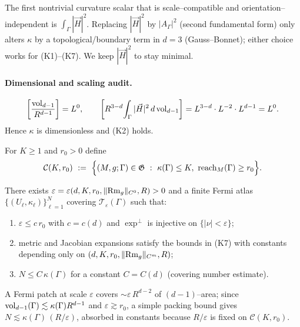 \begin{remark}[Minimality]
The first nontrivial curvature scalar that is scale–compatible and orientation–independent is $\int_\Gamma |\vec H|^2$. Replacing $|\vec H|^2$ by $|A_\Gamma|^2$ (second fundamental form) only alters $\kappa$ by a topological/boundary term in $d=3$ (Gauss–Bonnet); either choice works for (K1)–(K7). We keep $|\vec H|^2$ to stay minimal.
\end{remark}

\paragraph{Dimensional and scaling audit.}
\[
\left[\frac{\operatorname{vol}_{d-1}}{R^{d-1}}\right]=L^0,\qquad
\left[R^{3-d}\!\int_\Gamma |\vec H|^2\,d\operatorname{vol}_{d-1}\right]=L^{3-d}\cdot L^{-2}\cdot L^{d-1}=L^0.
\]
Hence $\kappa$ is dimensionless and (K2) holds.

\begin{definition}
\label{def:complexity-class}
For $K\ge 1$ and $r_0>0$ define
\[
\mathcal{C}(K,r_0)\ :=\ \Big\{(M,g;\Gamma)\in\mathfrak{G}\ :\ \kappa(\Gamma)\le K,\ \reach_M(\Gamma)\ge r_0\Big\}.
\]
\end{definition}

\begin{proposition}
\label{prop:uniform-atlas}
There exists $\varepsilon=\varepsilon(d,K,r_0,\|{\rm Rm}_g\|_{C^0},R)>0$ and a finite Fermi atlas $\{(U_\ell,\kappa_\ell)\}_{\ell=1}^N$ covering $\mathcal{T}_\varepsilon(\Gamma)$ such that:
\begin{enumerate}
\item $\varepsilon\le c\, r_0$ with $c=c(d)$ and $\exp^\perp$ is injective on $\{|\nu|<\varepsilon\}$;
\item metric and Jacobian expansions satisfy the bounds in \textup{(K7)} with constants depending only on $(d,K,r_0,\|{\rm Rm}_g\|_{C^m},R)$;
\item $N\le C\,\kappa(\Gamma)$ for a constant $C=C(d)$ (covering number estimate).
\end{enumerate}
\end{proposition}

\begin{remark}
A Fermi patch at scale $\varepsilon$ covers $\sim \varepsilon\,R^{d-2}$ of $(d\!-\!1)$–area; since $\operatorname{vol}_{d-1}(\Gamma)\lesssim \kappa(\Gamma)R^{d-1}$ and $\varepsilon\gtrsim r_0$, a simple packing bound gives $N\lesssim \kappa(\Gamma)\,(R/\varepsilon)$, absorbed in constants because $R/\varepsilon$ is fixed on $\mathcal{C}(K,r_0)$.
\end{remark}

